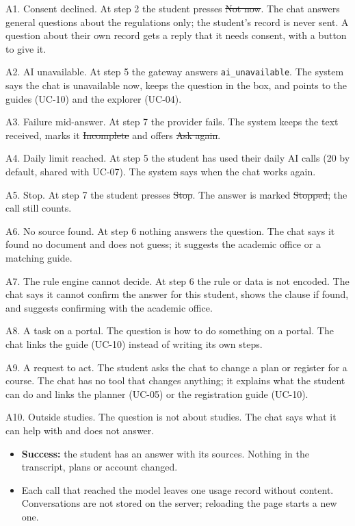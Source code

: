 \begin{altflows}
  \item[A1. Consent declined.] At step 2 the student presses \st{Not now}. The chat answers general questions about the
        regulations only; the student's record is never sent. A question about their own record gets a reply that it needs
        consent, with a button to give it.
  \item[A2. AI unavailable.] At step 5 the gateway answers \texttt{ai\_unavailable}. The system says the chat is
        unavailable now, keeps the question in the box, and points to the guides (UC-10) and the explorer (UC-04).
  \item[A3. Failure mid-answer.] At step 7 the provider fails. The system keeps the text received, marks it
        \st{Incomplete} and offers \st{Ask again}.
  \item[A4. Daily limit reached.] At step 5 the student has used their daily AI calls (20 by default, shared with UC-07).
        The system says when the chat works again.
  \item[A5. Stop.] At step 7 the student presses \st{Stop}. The answer is marked \st{Stopped}; the call still counts.
  \item[A6. No source found.] At step 6 nothing answers the question. The chat says it found no document and does not
        guess; it suggests the academic office or a matching guide.
  \item[A7. The rule engine cannot decide.] At step 6 the rule or data is not encoded. The chat says it cannot confirm the
        answer for this student, shows the clause if found, and suggests confirming with the academic office.
  \item[A8. A task on a portal.] The question is how to do something on a portal. The chat links the guide (UC-10) instead
        of writing its own steps.
  \item[A9. A request to act.] The student asks the chat to change a plan or register for a course. The chat has no tool
        that changes anything; it explains what the student can do and links the planner (UC-05) or the registration
        guide (UC-10).
  \item[A10. Outside studies.] The question is not about studies. The chat says what it can help with and does not
        answer.
\end{altflows}

\begin{itemize}
  \item \textbf{Success:} the student has an answer with its sources. Nothing in the transcript, plans or account changed.
  \item Each call that reached the model leaves one usage record without content. Conversations are not stored on the
        server; reloading the page starts a new one.
\end{itemize}

